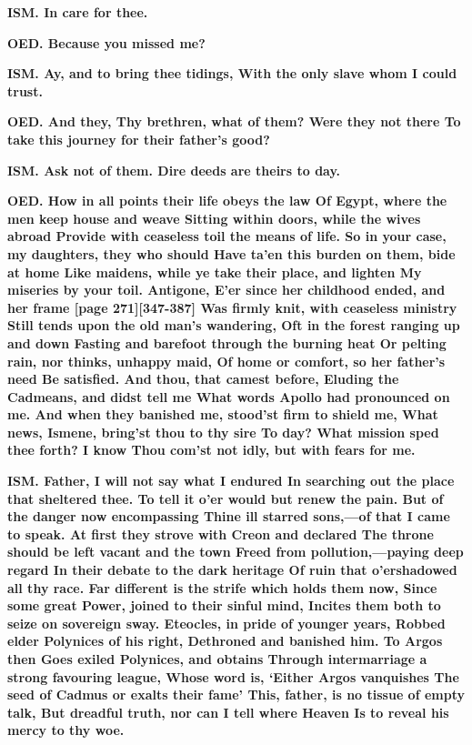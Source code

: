 \documentclass[11pt,letter]{book}
\begin{document}
\par \textbf{ISM. In care for thee.}
\par 

\par \textbf{OED. Because you missed me?}
\par 

\par \textbf{ISM. Ay, and to bring thee tidings, With the only slave whom I could trust.}
\par 

\par \textbf{OED. And they, Thy brethren, what of them? Were they not there To take this journey for their father’s good?}
\par 

\par \textbf{ISM. Ask not of them. Dire deeds are theirs to day.}
\par 

\par \textbf{OED. How in all points their life obeys the law Of Egypt, where the men keep house and weave Sitting within doors, while the wives abroad Provide with ceaseless toil the means of life. So in your case, my daughters, they who should Have ta’en this burden on them, bide at home Like maidens, while ye take their place, and lighten My miseries by your toil. Antigone, E’er since her childhood ended, and her frame [page 271][347-387] Was firmly knit, with ceaseless ministry Still tends upon the old man’s wandering, Oft in the forest ranging up and down Fasting and barefoot through the burning heat Or pelting rain, nor thinks, unhappy maid, Of home or comfort, so her father’s need Be satisfied. And thou, that camest before, Eluding the Cadmeans, and didst tell me What words Apollo had pronounced on me. And when they banished me, stood’st firm to shield me, What news, Ismene, bring’st thou to thy sire To day? What mission sped thee forth? I know Thou com’st not idly, but with fears for me.}
\par 

\par \textbf{ISM. Father, I will not say what I endured In searching out the place that sheltered thee. To tell it o’er would but renew the pain. But of the danger now encompassing Thine ill starred sons,—of that I came to speak. At first they strove with Creon and declared The throne should be left vacant and the town Freed from pollution,—paying deep regard In their debate to the dark heritage Of ruin that o’ershadowed all thy race. Far different is the strife which holds them now, Since some great Power, joined to their sinful mind, Incites them both to seize on sovereign sway. Eteocles, in pride of younger years, Robbed elder Polynices of his right, Dethroned and banished him. To Argos then Goes exiled Polynices, and obtains Through intermarriage a strong favouring league, Whose word is, ‘Either Argos vanquishes The seed of Cadmus or exalts their fame’ This, father, is no tissue of empty talk, But dreadful truth, nor can I tell where Heaven Is to reveal his mercy to thy woe.}
\par 
\end{document}
